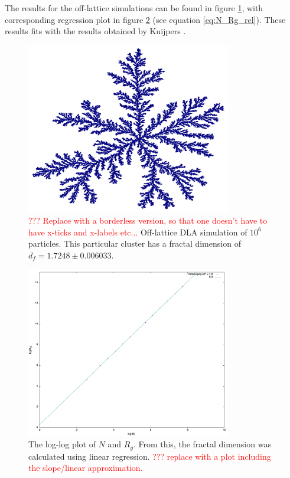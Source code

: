 The results for the off-lattice simulations can be found in figure \ref{fig:2d-DLA_1mill}, with corresponding regression plot in figure \ref{fig:loglog2d-DLA_1mill} (see equation \eqref{eq:N_Rg_rel}). These results fits with the results obtained by Kuijpers \cite{Kuijpers2014841}.
\begin{figure}
	\begin{center}
		\includegraphics[width = 0.8\textwidth]{fig/1_(1_7248).png}
		\caption{\textcolor{red}{??? Replace with a borderless version, so that one doesn't have to have x-ticks and x-labels etc...} Off-lattice DLA simulation of $10^6$ particles. This particular cluster has a fractal dimension of $d_f = 1.7248 \pm 0.006033$.}
		\label{fig:2d-DLA_1mill}
	\end{center}
\end{figure}

\begin{figure}
	\begin{center}
		\includegraphics[width = 0.8\textwidth]{fig/loglog(1_7248).png}
		\caption{The log-log plot of $N$ and $R_g$. From this, the fractal dimension was calculated using linear regression.  \textcolor{red}{??? replace with a plot including the slope/linear approximation.}}
		\label{fig:loglog2d-DLA_1mill}
	\end{center}
\end{figure}
